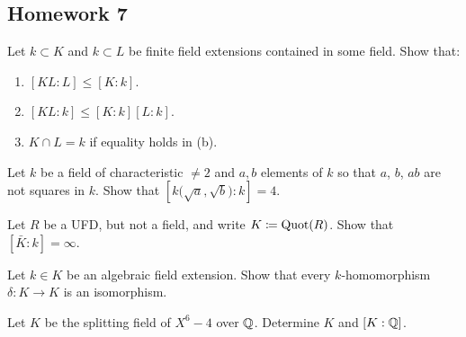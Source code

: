 \subsection{Homework 7}
\begin{problem}
  Let $k\subset K$ and $k\subset L$ be finite field extensions
  contained in some field. Show that:
  \begin{enumerate}[label=(\alph*),noitemsep]
  \item $[KL:L]\leq[K:k]$.
  \item $[KL:k]\leq[K:k][L:k]$.
  \item $K\cap L=k$ if equality holds in (b).
  \end{enumerate}
\end{problem}
\begin{solution}
\end{solution}

\begin{problem}
  Let $k$ be a field of characteristic $\neq 2$ and $a,b$ elements of
  $k$ so that $a$, $b$, $ab$ are not squares in $k$. Show that
  $\left[k{\bigl(\sqrt{a},\sqrt{b}\bigr)}:k\right]=4$.
\end{problem}
\begin{solution}
\end{solution}

\begin{problem}
  Let $R$ be a UFD, but not a field, and write $ K\coloneq\operatorname{Quot}(R)$. Show
  that $[\bar K:k]=\infty$.
\end{problem}
\begin{solution}
\end{solution}

\begin{problem}
  Let $k\in K$ be an algebraic field extension. Show that every
  $k$-homomorphism $\delta\colon K\to K$ is an isomorphism.
\end{problem}
\begin{solution}
\end{solution}

\begin{problem}
  Let $ K$ be the splitting field of $X^6-4$ over $\mathbb{Q}$. Determine
  $ K$ and $[ K:\mathbb{Q}]$.
\end{problem}
\begin{solution}
\end{solution}

